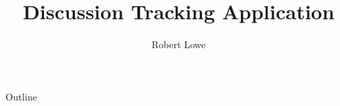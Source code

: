 \documentclass[handout]{beamer}
\title{Discussion Tracking Application}
\author{Robert Lowe}
\institute[Southeast Missouri State University] %
{
  Department of Computer Science\\
  Southeast Missouri State University
}
\date[]{}
\begin{document}
\begin{frame}
  \titlepage
\end{frame}

\begin{frame}{Outline}
  \tableofcontents
\end{frame}




\end{document}
